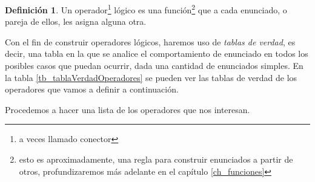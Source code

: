\documentclass{book}
\theoremstyle{definition}
\newtheorem{df}{Definición}[chapter]
\begin{document}
\begin{df}
	Un operador\footnote{a veces llamado conector} lógico es una función\footnote %
	{esto es aproximadamente, una regla para construir enunciados a partir de otros, profundizaremos más adelante en el capítulo \ref{ch_funciones}}
	que a cada enunciado, o pareja de ellos, les asigna alguna otra.
\end{df}

Con el fin de construir operadores lógicos, haremos uso de \emph{tablas de verdad}, es decir, una tabla en la que se analice el comportamiento de enunciado en todos los posibles casos que puedan ocurrir, dada una cantidad de enunciados simples. En la tabla \ref{tb_tablaVerdadOperadores} se pueden ver las tablas de verdad de los operadores que vamos a definir a continuación.

Procedemos a hacer una lista de los operadores que nos interesan.
\end{document}

